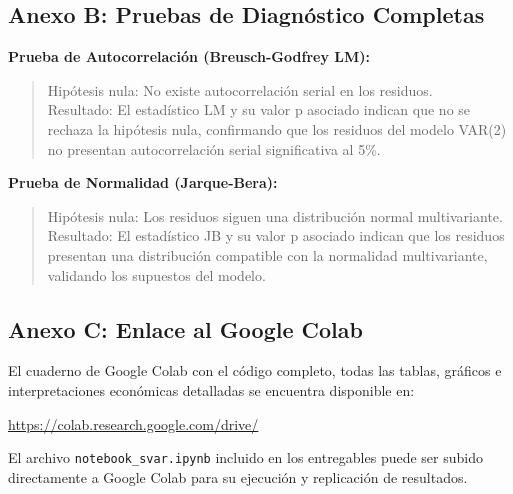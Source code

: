 \documentclass[12pt,a4paper]{article}
\begin{document}
\subsection*{Anexo B: Pruebas de Diagnóstico Completas}

\medskip
\noindent\textbf{Prueba de Autocorrelación (Breusch-Godfrey LM):}
\begin{quote}
Hipótesis nula: No existe autocorrelación serial en los residuos.\\
Resultado: El estadístico LM y su valor p asociado indican que no se rechaza la hipótesis nula, confirmando que los residuos del modelo VAR(2) no presentan autocorrelación serial significativa al 5\%.
\end{quote}

\medskip
\noindent\textbf{Prueba de Normalidad (Jarque-Bera):}
\begin{quote}
Hipótesis nula: Los residuos siguen una distribución normal multivariante.\\
Resultado: El estadístico JB y su valor p asociado indican que los residuos presentan una distribución compatible con la normalidad multivariante, validando los supuestos del modelo.
\end{quote}

\subsection*{Anexo C: Enlace al Google Colab}

\medskip
\noindent El cuaderno de Google Colab con el código completo, todas las tablas, gráficos e interpretaciones económicas detalladas se encuentra disponible en:
\begin{center}
\url{https://colab.research.google.com/drive/}
\end{center}

\noindent El archivo \texttt{notebook\_svar.ipynb} incluido en los entregables puede ser subido directamente a Google Colab para su ejecución y replicación de resultados.
\end{document}
